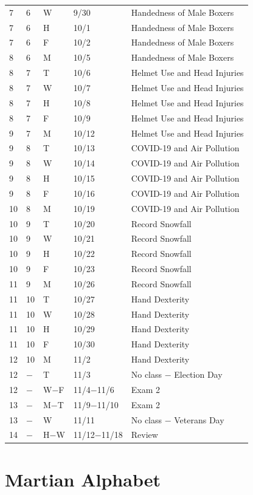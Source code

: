 \documentclass[
]{report}
\begin{document}
\begin{longtable}{|p{}|l|p{}|l|p{}|}
7& 6& W& 9/30& Handedness of Male Boxers \\*	
7& 6& H& 10/1& Handedness of Male Boxers \\*
7& 6& F& 10/2& Handedness of Male Boxers \\ \hline
8& 6& M& 10/5& Handedness of Male Boxers \\*
8& 7& T& 10/6& Helmet Use and Head Injuries \\*
8& 7& W& 10/7& Helmet Use and Head Injuries \\*	
8& 7& H& 10/8& Helmet Use and Head Injuries \\*
8& 7& F& 10/9& Helmet Use and Head Injuries \\ \hline
9& 7& M& 10/12& Helmet Use and Head Injuries \\*
9& 8& T& 10/13& COVID-19 and Air Pollution \\*
9& 8& W& 10/14& COVID-19 and Air Pollution \\*	
9& 8& H& 10/15& COVID-19 and Air Pollution \\*
9& 8& F& 10/16& COVID-19 and Air Pollution \\ \hline
10& 8& M& 10/19& COVID-19 and Air Pollution \\*
10& 9& T& 10/20& Record Snowfall \\*
10& 9& W& 10/21& Record Snowfall \\*	
10& 9& H& 10/22& Record Snowfall \\*
10& 9& F& 10/23& Record Snowfall \\ \hline
11& 9& M& 10/26& Record Snowfall \\*
11& 10& T& 10/27& Hand Dexterity \\*
11& 10& W& 10/28& Hand Dexterity \\*	
11& 10& H& 10/29& Hand Dexterity \\*
11& 10& F& 10/30& Hand Dexterity \\ \hline
12& 10& M& 11/2& Hand Dexterity \\*
12& $-$& T& 11/3& No class  $-$  Election Day \\*
12& $-$& W$-$F& 11/4$-$11/6& Exam 2 \\ \hline
13& $-$& M$-$T& 11/9$-$11/10& Exam 2 \\*
13& $-$& W& 11/11& No class  $-$  Veterans Day \\*
14& $-$& H$-$W&11/12$-$11/18& Review \\ \hline
\end{longtable}

\hypertarget{martian-alphabet}{%
\chapter{Martian Alphabet}\label{martian-alphabet}}
\end{document}

